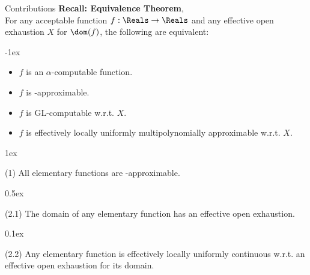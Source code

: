 \begin{frame}{Contributions}
    \vspace{-1em}
    {\color{gray}
    \textcolor{OliveGreen}{\textbf{Recall: Equivalence Theorem}, \citep{ModelOfCompForPartFunc_MingQuanFuAndJeffZucker}}\\
    For any {acceptable function} $f:\Reals\to\Reals$ and any {effective open exhaustion} $X$ for $\dom(f)$, the following are equivalent:}

    \kern-1ex
        \begin{itemize}
            \setlength\itemsep{-3pt}\color{gray}
            \item $f$ is an $\alpha$-computable function.
            \item $f$ is \WhileCC-approximable.
            \item $f$ is GL-computable w.r.t. $X$.
            \item $f$ is effectively locally uniformly multipolynomially approximable w.r.t. $X$.
        \end{itemize}

    \kern1ex
    \begin{ntheorem}(1)
        All elementary functions are \WhileCC-approximable.
    \end{ntheorem}

    \kern0.5ex
    \begin{ntheorem}(2.1)
        The domain of any elementary function has an effective open exhaustion.
    \end{ntheorem}
    
    \kern0.1ex
    \begin{ntheorem}(2.2)
        Any elementary function is {effectively locally uniformly continuous} w.r.t.\null{} an effective open exhaustion for its domain.
    \end{ntheorem}
\end{frame}
